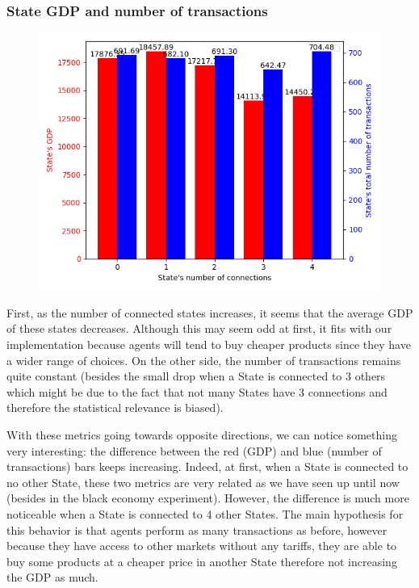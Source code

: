 {{{{{{{{{{{{{{        \subsubsection{State GDP and number of transactions}

        \begin{figure}
            \includegraphics[width=\linewidth]{img/exp/9_1.png}
        \end{figure} 
        { First, as the number of connected states increases, it seems that the average GDP of these states decreases. Although this may seem odd at first, it fits with our implementation because agents will tend to buy cheaper products since they have a wider range of choices. On the other side, the number of transactions remains quite constant (besides the small drop when a State is connected to 3 others which might be due to the fact that not many States have 3 connections and therefore the statistical relevance is biased).

        With these metrics going towards opposite directions, we can notice something very interesting: the difference between the red (GDP) and blue (number of transactions) bars keeps increasing. Indeed, at first, when a State is connected to no other State, these two metrics are very related as we have seen up until now (besides in the black economy experiment). However, the difference is much more noticeable when a State is connected to 4 other States. The main hypothesis for this behavior is that agents perform as many transactions as before, however because they have access to other markets without any tariffs, they are able to buy some products at a cheaper price in another State therefore not increasing the GDP as much.

}}}}}}}}}}}}}}}
